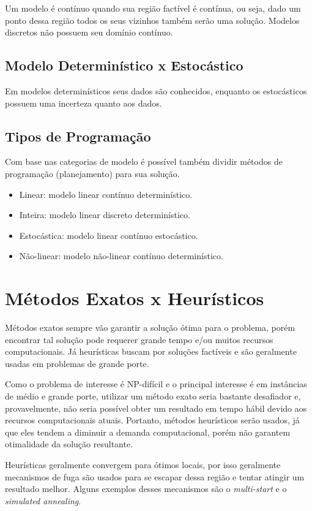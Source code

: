 Um modelo é contínuo quando sua região factível é contínua, ou seja, dado um ponto dessa região todos os seus vizinhos também serão uma solução.
Modelos discretos não possuem seu domínio contínuo.

\subsection{Modelo Determinístico x Estocástico}\label{subsec:modelo-deterministico-x-estocastico}

Em modelos determinísticos seus dados são conhecidos, enquanto os estocásticos possuem uma incerteza quanto aos dados.

\subsection{Tipos de Programação}\label{subsec:tipos-de-programacao}

Com base nas categorias de modelo é possível também dividir métodos de programação (planejamento) para sua solução.

\begin{itemize}
    \item Linear: modelo linear contínuo determinístico.
    \item Inteira: modelo linear discreto determinístico.
    \item Estocástica: modelo linear contínuo estocástico.
    \item Não-linear: modelo não-linear contínuo determinístico.
\end{itemize}


\section{Métodos Exatos x Heurísticos}\label{sec:metodos-exatos-heuristicos}

Métodos exatos sempre vão garantir a solução ótima para o problema, porém encontrar tal solução pode requerer grande tempo e/ou muitos recursos computacionais.
Já heurísticas buscam por soluções factíveis e são geralmente usadas em problemas de grande porte.

Como o problema de interesse é NP-difícil e o principal interesse é em instâncias de médio e grande porte, utilizar um método exato seria bastante desafiador e, provavelmente, não seria possível obter um resultado em tempo hábil devido aos recursos computacionais atuais.
Portanto, métodos heurísticos serão usados, já que eles tendem a diminuir a demanda computacional, porém não garantem otimalidade da solução resultante.

Heurísticas geralmente convergem para ótimos locais, por isso geralmente mecanismos de fuga são usados para se escapar dessa região e tentar atingir um resultado melhor.
Alguns exemplos desses mecanismos são o \textit{multi-start} e o \textit{simulated annealing}.
